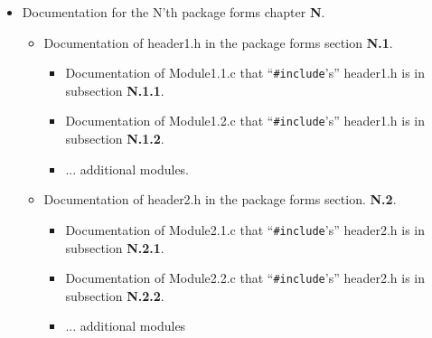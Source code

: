 \documentclass[oneside]{book}
\begin{document}
\begin{itemize}
    \vspace*{-0.1in}
    \item Documentation for the N'th package forms chapter {\large \bf N}.
    \vspace*{-0.051in}
    \begin{itemize}
        \vspace*{-0.051in}
        \item Documentation of header1.h in the package forms section
             {\large \bf N.1}.
             \begin{itemize}
                 \vspace*{-0.051in}
                 \item Documentation of Module1.1.c that
                       ``{\texttt {\#include}}'s'' header1.h
                       is in subsection {\large \bf N.1.1}.
                 \vspace*{-0.051in}
                 \item Documentation of Module1.2.c that
                       ``{\texttt {\#include}}'s'' header1.h
                       is in subsection {\large \bf N.1.2}.
                 \vspace*{-0.051in}
                 \item ... additional modules.
             \end{itemize}
        \vspace*{-0.051in}
        \item Documentation of header2.h in the package forms section.
             {\large \bf N.2}.
             \begin{itemize}
                 \vspace*{-0.051in}
                 \item Documentation of Module2.1.c that
                       ``{\texttt {\#include}}'s'' header2.h
                       is in subsection {\large \bf N.2.1}.
                 \vspace*{-0.051in}
                 \item Documentation of Module2.2.c that
                       ``{\texttt {\#include}}'s'' header2.h
                       is in subsection {\large \bf N.2.2}.
                 \vspace*{-0.051in}
                 \item ... additional modules
             \end{itemize}
        \vspace*{-0.051in}

\end{itemize}
\end{itemize}
\end{document}
